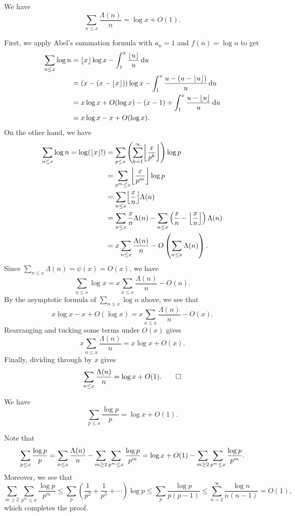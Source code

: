 \begin{thm}\label{thm:2.11}
We have 
\[ \sum_{n \leq x} \frac{\Lambda(n)}n = \log x + O(1). \]
\end{thm}
\begin{pf}
First, we apply Abel's summation formula with $a_n = 1$ 
and $f(n) = \log n$ to get 
\begin{align*}
    \sum_{n\leq x} \log n
    &= \lfloor x\rfloor \log x - \int_1^x \frac{\lfloor u\rfloor}u\,\mathrm{d} u \\
    &= (x - (x - \lfloor x\rfloor))\log x - \int_1^x 
    \frac{u - (u - \lfloor u\rfloor)}u \,\mathrm{d} u \\
    &= x\log x + O(\log x) - (x-1) + \int_1^x \frac{u - \lfloor u\rfloor}u\,\mathrm{d} u \\
    &= x\log x - x + O(\log x).
\end{align*}
On the other hand, we have 
\begin{align*}
    \sum_{n\leq x} \log n 
    = \log(\floor{x}!) 
    &= \sum_{p\leq x} \left( \sum_{k=1}^\infty \floor*{\frac{x}{p^k}} \right)\log p \\
    &= \sum_{p^m \leq x} \floor*{\frac{x}{p^m}} \log p \\
    &= \sum_{n \leq x} \floor*{\frac xn} \Lambda(n) \\
    &= \sum_{n \leq x} \frac xn \Lambda(n) - 
    \sum_{n\leq x} \left( \frac xn - \floor*{\frac xn} \right)
    \Lambda(n) \\
    &= x \sum_{n\leq x} \frac{\Lambda(n)}n - O\left( \sum_{n\leq x} \Lambda(n) \right). 
\end{align*}
Since $\sum_{n\leq x} \Lambda(n) = \psi(x) = O(x)$, we have 
\[ \sum_{n\leq x} \log x = x \sum_{n \leq x} \frac{\Lambda(n)}n - O(n). \]
By the asymptotic formula of $\sum_{n\leq x} \log n$ above, we see that 
\[ x\log x - x + O(\log x) = x\sum_{n\leq x} \frac{\Lambda(n)}n - O(x). \]
Rearranging and tucking some terms under $O(x)$ gives 
\[ x \sum_{n\leq x} \frac{\Lambda(n)}n = x\log x + O(x). \]
Finally, dividing through by $x$ gives 
\[ \sum_{n\leq x} \frac{\Lambda(n)}n = \log x + O(1). \qedhere \]
\end{pf}

\begin{thm}\label{thm:2.12}
We have
\[ \sum_{p\leq x} \frac{\log p}p = \log x + O(1). \]
\end{thm}
\begin{pf}
Note that 
\[ \sum_{p \leq x} \frac{\log p}p 
= \sum_{n \leq x} \frac{\Lambda(n)}n - \sum_{m\geq2} \sum_{p^m\leq x} \frac{\log p}{p^m} \\
= \log x + O(1) - \sum_{m\geq2}\sum_{p^m\leq x}
\frac{\log p}{p^m}. \]
Moreover, we see that 
\[ \sum_{m\geq2}\sum_{p^m\leq x}
\frac{\log p}{p^m} \leq \sum_p \left( \frac1{p^2} + \frac1{p^3} + \cdots \right)\log p 
\leq \sum_p \frac{\log p}{p(p-1)} 
\leq \sum_{n=2}^\infty \frac{\log n}{n(n-1)} = O(1), \]
which completes the proof.
\end{pf}

